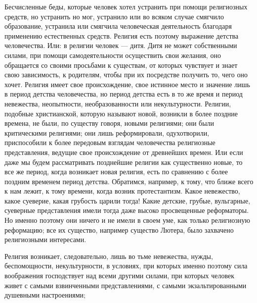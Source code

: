 \documentclass[12pt]{article}
\begin{document}
Бесчисленные беды, которые человек хотел устранить при помощи религиозных средств, но устранить но мог, устранило или во всяком случае смягчило образование, устранила или смягчила человеческая деятельность благодаря применению естественных средств. Религия есть поэтому выражение детства человечества. Или: в религии человек --- дитя. Дитя не может собственными силами, при помощи самодеятельности осуществить свои желания, оно обращается со своими просьбами к существам, от которых чувствует и знает свою зависимость, к родителям, чтобы при их посредстве получить то, чего оно хочет. Религия имеет свое происхождение, свое истинное место и значение лишь в период детства человечества, но период детства есть в то же время и период невежества, неопытности, необразованности или некультурности. Религии, подобные христианской, которую называют новой, возникли в более поздние времена, не были, по существу говоря, новыми религиями; они были критическими религиями; они лишь реформировали, одухотворили, приспособили к более передовым взглядам человечества религиозные представления, ведущие свое происхождение от древнейших времен. Или если даже мы будем рассматривать позднейшие религии как существенно новые, то все же период, когда возникает новая религия, есть по сравнению с более поздним временем период детства. Обратимся, например, к тому, что ближе всего к нам лежит, к тому времени, когда возник протестантизм. Какое невежество, какое суеверие, какая грубость царили тогда! Какие детские, грубые, вульгарные, суеверные представления имели тогда даже высоко просвещенные реформаторы. Но именно поэтому они ничего и не имели в своем уме, как только религиозную реформацию; все их существо, например существо Лютера, было захвачено религиозными интересами. 

Религия возникает, следовательно, лишь во тьме невежества, нужды, беспомощности, некультурности, в условиях, при которых именно поэтому сила воображения господствует над всеми другими силами, при которых человек живет с самыми взвинченными представлениями, с самыми экзальтированными душевными настроениями; 
\end{document}
